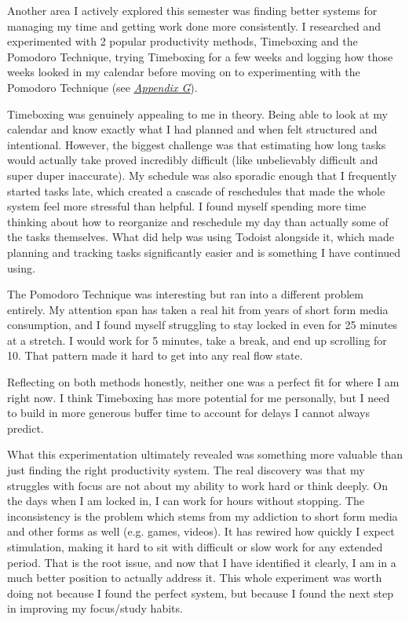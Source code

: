 \documentclass[12pt]{article}
\let\oldhyperref\hyperref
\renewcommand{\hyperref}[2][]{\oldhyperref[#1]{\textit{\uline{#2}}}}
\begin{document}
            Another area I actively explored this semester was finding better systems for managing my time and getting work done more consistently. I researched and experimented with 2 popular productivity methods, Timeboxing and the Pomodoro Technique, trying Timeboxing for a few weeks and logging how those weeks looked in my calendar before moving on to experimenting with the Pomodoro Technique (see \hyperref[appendix:g]{Appendix G}).

            Timeboxing was genuinely appealing to me in theory. Being able to look at my calendar and know exactly what I had planned and when felt structured and intentional. However, the biggest challenge was that estimating how long tasks would actually take proved incredibly difficult (like unbelievably difficult and super duper inaccurate). My schedule was also sporadic enough that I frequently started tasks late, which created a cascade of reschedules that made the whole system feel more stressful than helpful. I found myself spending more time thinking about how to reorganize and reschedule my day than actually some of the tasks themselves. What did help was using Todoist alongside it, which made planning and tracking tasks significantly easier and is something I have continued using.

            The Pomodoro Technique was interesting but ran into a different problem entirely. My attention span has taken a real hit from years of short form media consumption, and I found myself struggling to stay locked in even for 25 minutes at a stretch. I would work for 5 minutes, take a break, and end up scrolling for 10. That pattern made it hard to get into any real flow state.

            Reflecting on both methods honestly, neither one was a perfect fit for where I am right now. I think Timeboxing has more potential for me personally, but I need to build in more generous buffer time to account for delays I cannot always predict.

            What this experimentation ultimately revealed was something more valuable than just finding the right productivity system. The real discovery was that my struggles with focus are not about my ability to work hard or think deeply. On the days when I am locked in, I can work for hours without stopping. The inconsistency is the problem which stems from my addiction to short form media and other forms as well (e.g. games, videos). It has rewired how quickly I expect stimulation, making it hard to sit with difficult or slow work for any extended period. That is the root issue, and now that I have identified it clearly, I am in a much better position to actually address it. This whole experiment was worth doing not because I found the perfect system, but because I found the next step in improving my focus/study habits.
\end{document}
